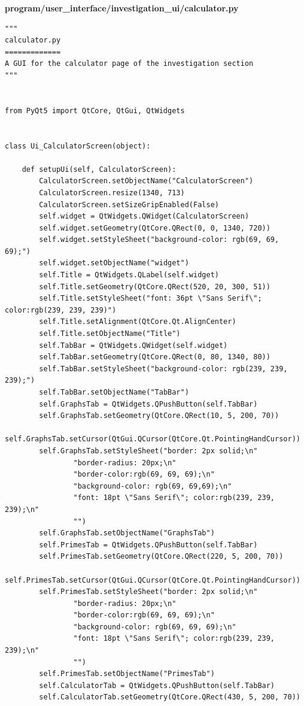 \documentclass{article}
\begin{document}
\textbf{program/user\_interface/investigation\_ui/calculator.py}
\begin{lstlisting}
"""
calculator.py
=============
A GUI for the calculator page of the investigation section
"""


from PyQt5 import QtCore, QtGui, QtWidgets


class Ui_CalculatorScreen(object):

    def setupUi(self, CalculatorScreen):
        CalculatorScreen.setObjectName("CalculatorScreen")
        CalculatorScreen.resize(1340, 713)
        CalculatorScreen.setSizeGripEnabled(False)
        self.widget = QtWidgets.QWidget(CalculatorScreen)
        self.widget.setGeometry(QtCore.QRect(0, 0, 1340, 720))
        self.widget.setStyleSheet("background-color: rgb(69, 69, 69);")
        self.widget.setObjectName("widget")
        self.Title = QtWidgets.QLabel(self.widget)
        self.Title.setGeometry(QtCore.QRect(520, 20, 300, 51))
        self.Title.setStyleSheet("font: 36pt \"Sans Serif\"; color:rgb(239, 239, 239)")
        self.Title.setAlignment(QtCore.Qt.AlignCenter)
        self.Title.setObjectName("Title")
        self.TabBar = QtWidgets.QWidget(self.widget)
        self.TabBar.setGeometry(QtCore.QRect(0, 80, 1340, 80))
        self.TabBar.setStyleSheet("background-color: rgb(239, 239, 239);")
        self.TabBar.setObjectName("TabBar")
        self.GraphsTab = QtWidgets.QPushButton(self.TabBar)
        self.GraphsTab.setGeometry(QtCore.QRect(10, 5, 200, 70))
        self.GraphsTab.setCursor(QtGui.QCursor(QtCore.Qt.PointingHandCursor))
        self.GraphsTab.setStyleSheet("border: 2px solid;\n"
                "border-radius: 20px;\n"
                "border-color:rgb(69, 69, 69);\n"
                "background-color: rgb(69, 69,69);\n"
                "font: 18pt \"Sans Serif\"; color:rgb(239, 239, 239);\n"
                "")
        self.GraphsTab.setObjectName("GraphsTab")
        self.PrimesTab = QtWidgets.QPushButton(self.TabBar)
        self.PrimesTab.setGeometry(QtCore.QRect(220, 5, 200, 70))
        self.PrimesTab.setCursor(QtGui.QCursor(QtCore.Qt.PointingHandCursor))
        self.PrimesTab.setStyleSheet("border: 2px solid;\n"
                "border-radius: 20px;\n"
                "border-color:rgb(69, 69, 69);\n"
                "background-color: rgb(69, 69, 69);\n"
                "font: 18pt \"Sans Serif\"; color:rgb(239, 239, 239);\n"
                "")
        self.PrimesTab.setObjectName("PrimesTab")
        self.CalculatorTab = QtWidgets.QPushButton(self.TabBar)
        self.CalculatorTab.setGeometry(QtCore.QRect(430, 5, 200, 70))

\end{lstlisting}
\end{document}
